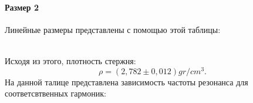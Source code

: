\documentclass[a4paper, 12pt]{article}%
\begin{document}
\paragraph*{Размер 2}
Линейные размеры представлены с помощью этой таблицы:
\begin{table}[h!]
\end{table}
\\Исходя из этого, плотность стержня:
\begin{equation}
\rho=(2,782\pm0,012)gr/cm^3.
\end{equation}
На данной талице представлена зависимость частоты резонанса для соответсвтвенных гармоник:
\begin{table}[h!]
\end{table}
\end{document}
